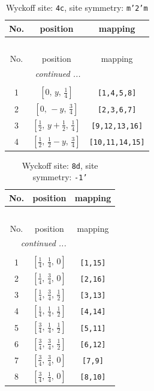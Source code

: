 \documentclass[fleqn,8pt]{jsarticle}
\begin{document}
\renewcommand{\arraystretch}{1.2}
\begin{longtable}{ccc}
\caption{Wyckoff site: {\tt 4c}, site symmetry: {\tt m'2'm}}
 \\
 \hline \hline
No. & position & mapping \\ \hline \endfirsthead

\multicolumn{2}{l}{\tablename\ \thetable{}} \\
 \hline \hline
No. & position & mapping \\ \hline \endhead

 \hline \hline
\multicolumn{2}{r}{\footnotesize\it continued ...} \\ \endfoot

 \hline \hline
\multicolumn{2}{r}{} \\ \endlastfoot

1 & $\left[ 0,\, y,\, \frac{1}{4} \right]$ & {\tt [1,4,5,8]} \\ \hline
2 & $\left[ 0,\, - y,\, \frac{3}{4} \right]$ & {\tt [2,3,6,7]} \\ \hline
3 & $\left[ \frac{1}{2},\, y + \frac{1}{2},\, \frac{1}{4} \right]$ & {\tt [9,12,13,16]} \\ \hline
4 & $\left[ \frac{1}{2},\, \frac{1}{2} - y,\, \frac{3}{4} \right]$ & {\tt [10,11,14,15]} \\
\end{longtable}
\renewcommand{\arraystretch}{1.2}
\begin{longtable}{ccc}
\caption{Wyckoff site: {\tt 8d}, site symmetry: {\tt -1'}}
 \\
 \hline \hline
No. & position & mapping \\ \hline \endfirsthead

\multicolumn{2}{l}{\tablename\ \thetable{}} \\
 \hline \hline
No. & position & mapping \\ \hline \endhead

 \hline \hline
\multicolumn{2}{r}{\footnotesize\it continued ...} \\ \endfoot

 \hline \hline
\multicolumn{2}{r}{} \\ \endlastfoot

1 & $\left[ \frac{1}{4},\, \frac{1}{4},\, 0 \right]$ & {\tt [1,15]} \\ \hline
2 & $\left[ \frac{1}{4},\, \frac{3}{4},\, 0 \right]$ & {\tt [2,16]} \\ \hline
3 & $\left[ \frac{1}{4},\, \frac{3}{4},\, \frac{1}{2} \right]$ & {\tt [3,13]} \\ \hline
4 & $\left[ \frac{1}{4},\, \frac{1}{4},\, \frac{1}{2} \right]$ & {\tt [4,14]} \\ \hline
5 & $\left[ \frac{3}{4},\, \frac{1}{4},\, \frac{1}{2} \right]$ & {\tt [5,11]} \\ \hline
6 & $\left[ \frac{3}{4},\, \frac{3}{4},\, \frac{1}{2} \right]$ & {\tt [6,12]} \\ \hline
7 & $\left[ \frac{3}{4},\, \frac{3}{4},\, 0 \right]$ & {\tt [7,9]} \\ \hline
8 & $\left[ \frac{3}{4},\, \frac{1}{4},\, 0 \right]$ & {\tt [8,10]} \\
\end{longtable}
\end{document}
